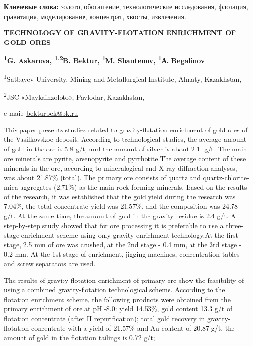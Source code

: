 {\bfseries Ключевые слова:} золото, обогащение, технологические
исследования, флотация, гравитация, моделирование, концентрат, хвосты,
извлечения.

{\bfseries TECHNOLOGY OF GRAVITY-FLOTATION ENRICHMENT OF GOLD ORES}

{\bfseries \textsuperscript{1}G. Askarova, \textsuperscript{1,2}B.
Bektur\textsuperscript{\envelope }, \textsuperscript{1}M. Shautenov,
\textsuperscript{1}А. Begalinov}

\textsuperscript{1}Satbayev University, Mining and Metallurgical
Institute, Almaty, Kazakhstan,

\textsuperscript{2}JSC «Maykainzoloto», Pavlodar, Kazakhstan,

e-mail: \href{mailto:bekturbek@bk.run}{bekturbek@bk.ru}

This paper presents studies related to gravity-flotation enrichment of
gold ores of the Vasilkovskoe deposit. According to technological
studies, the average amount of gold in the ore is 5.8 g/t, and the
amount of silver is about 2.1. g/t. The main ore minerals are pyrite,
arsenopyrite and pyrrhotite.The average content of these minerals in the
ore, according to mineralogical and X-ray diffraction analyses, was
about 21.87\% (total). The primary ore consists of quartz and
quartz-chlorite-mica aggregates (2.71\%) as the main rock-forming
minerals. Based on the results of the research, it was established that
the gold yield during the research was 7.04\%, the total concentrate
yield was 21.57\%, and the composition was 24.78 g/t. At the same time,
the amount of gold in the gravity residue is 2.4 g/t. A step-by-step
study showed that for ore processing it is preferable to use a
three-stage enrichment scheme using only gravity enrichment
technology.At the first stage, 2.5 mm of ore was crushed, at the 2nd
stage - 0.4 mm, at the 3rd stage - 0.2 mm. At the 1st stage of
enrichment, jigging machines, concentration tables and screw separators
are used.

The results of gravity-flotation enrichment of primary ore show the
feasibility of using a combined gravity-flotation technological scheme.
According to the flotation enrichment scheme, the following products
were obtained from the primary enrichment of ore at pH -8.0: yield
14.53\%, gold content 13.3 g/t of flotation concentrate (after II
repurification); total gold recovery in gravity-flotation concentrate
with a yield of 21.57\% and Au content of 20.87 g/t, the amount of gold
in the flotation tailings is 0.72 g/t;

